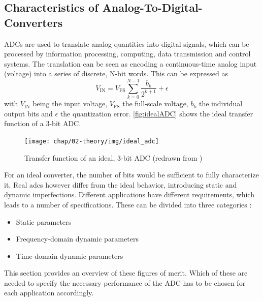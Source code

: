 \subsection{Characteristics of Analog-To-Digital-Converters}
ADCs are used to translate analog quantities into digital signals, which can be processed by information processing, computing, data transmission and control systems. The translation can be seen as encoding a continuous-time analog input (voltage) into a series of discrete, N-bit words. This can be expressed as
\begin{equation}
	V_{\text{IN}} = V_{\text{FS}} \sum_{k = 0}^{N-1} \frac{b_k}{2^{k+1}} + \epsilon
\end{equation}
with $V_{\text{IN}}$ being the input voltage, $V_{\text{FS}}$ the full-scale voltage, $b_k$ the individual output bits and $\epsilon$ the quantization error. \autoref{fig:idealADC} shows the ideal transfer function of a 3-bit ADC.
\begin{figure}[H]
	\centering
	\texttt{[image: chap/02-theory/img/ideal\_adc]}
	\caption{Transfer function of an ideal, 3-bit ADC (redrawn from \cite{Lundberg})}
	\label{fig:idealADC}
\end{figure}



For an ideal converter, the number of bits would be sufficient to fully characterize it. Real \glspl{adc} however differ from the ideal behavior, introducing static and dynamic imperfections. Different applications have different requirements, which leads to a number of specifications. These can be divided into three categories \cite{Lundberg}:
\begin{itemize}[noitemsep]
	\item Static parameters
	\item Frequency-domain dynamic parameters
	\item Time-domain dynamic parameters
\end{itemize}
This section provides an overview of these figures of merit. Which of these are needed to specify the necessary performance of the ADC has to be chosen for each application accordingly.


